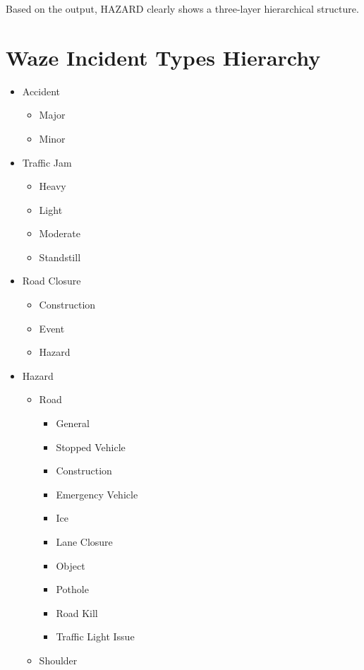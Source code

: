 \documentclass[
  letterpaper,
  DIV=11,
  numbers=noendperiod]{scrartcl}
\providecommand{\tightlist}{%
  \setlength{\itemsep}{0pt}\setlength{\parskip}{0pt}}\usepackage{longtable,booktabs,array}
\begin{document}
Based on the output, HAZARD clearly shows a three-layer hierarchical
structure.

\section{Waze Incident Types
Hierarchy}\label{waze-incident-types-hierarchy}

\begin{itemize}
\tightlist
\item
  Accident

  \begin{itemize}
  \tightlist
  \item
    Major
  \item
    Minor
  \end{itemize}
\item
  Traffic Jam

  \begin{itemize}
  \tightlist
  \item
    Heavy
  \item
    Light
  \item
    Moderate
  \item
    Standstill
  \end{itemize}
\item
  Road Closure

  \begin{itemize}
  \tightlist
  \item
    Construction
  \item
    Event
  \item
    Hazard
  \end{itemize}
\item
  Hazard

  \begin{itemize}
  \tightlist
  \item
    Road

    \begin{itemize}
    \tightlist
    \item
      General
    \item
      Stopped Vehicle
    \item
      Construction
    \item
      Emergency Vehicle
    \item
      Ice
    \item
      Lane Closure
    \item
      Object
    \item
      Pothole
    \item
      Road Kill
    \item
      Traffic Light Issue
    \end{itemize}
  \item
    Shoulder


\end{itemize}
\end{itemize}
\end{document}
